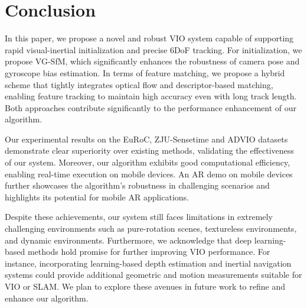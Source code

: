\section{Conclusion}
In this paper, we propose a novel and robust VIO system capable of supporting rapid visual-inertial initialization and precise 6DoF tracking. For initialization, we propose VG-SfM, which significantly enhances the robustness of camera pose and gyroscope bias estimation. In terms of feature matching, we propose a hybrid scheme that tightly integrates optical flow and descriptor-based matching, enabling feature tracking to maintain high accuracy even with long track length.  Both approaches contribute significantly to the performance enhancement of our algorithm. 

Our experimental results on the EuRoC, ZJU-Sensetime and ADVIO datasets demonstrate clear superiority over existing methods, validating the effectiveness of our system. Moreover, our algorithm exhibits good computational efficiency, enabling real-time execution on mobile devices. An AR demo on mobile devices further showcases the algorithm's robustness in challenging scenarios and highlights its potential for mobile AR applications.

Despite these achievements, our system still faces limitations in extremely challenging environments such as pure-rotation scenes, textureless environments, and dynamic environments. Furthermore, we acknowledge that deep learning-based methods hold promise for further improving VIO performance. For instance, incorporating learning-based depth estimation and inertial navigation systems could provide additional geometric and motion measurements suitable for VIO or SLAM. We plan to explore these avenues in future work to refine and enhance our algorithm.